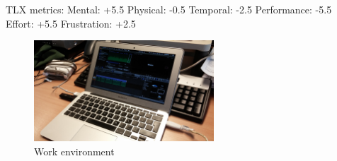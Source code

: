 TLX metrics:
Mental: +5.5
Physical: -0.5
Temporal: -2.5
Performance: -5.5
Effort: +5.5
Frustration: +2.5

\begin{figure}[ht]
  \centering
  \includegraphics[width=0.6\textwidth]{figs/study2-participantB-workspace.jpg}
  \caption{Work environment}
  \label{fig:study2-participantB-workspace}
\end{figure}

